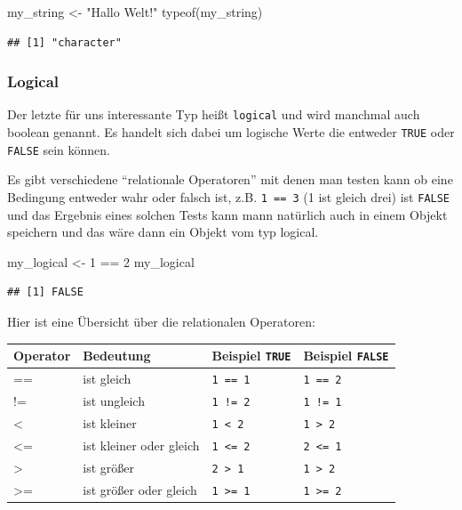 \documentclass[
]{book}
\newenvironment{Shaded}{\begin{snugshade}}{\end{snugshade}}
\newcommand{\DecValTok}[1]{\textcolor[rgb]{0.00,0.00,0.81}{#1}}
\newcommand{\FunctionTok}[1]{\textcolor[rgb]{0.00,0.00,0.00}{#1}}
\newcommand{\NormalTok}[1]{#1}
\newcommand{\OtherTok}[1]{\textcolor[rgb]{0.56,0.35,0.01}{#1}}
\newcommand{\SpecialCharTok}[1]{\textcolor[rgb]{0.00,0.00,0.00}{#1}}
\newcommand{\StringTok}[1]{\textcolor[rgb]{0.31,0.60,0.02}{#1}}
\begin{document}
\begin{Shaded}
\begin{Highlighting}[]
\NormalTok{my\_string }\OtherTok{\textless{}{-}} \StringTok{"Hallo Welt!"}
\FunctionTok{typeof}\NormalTok{(my\_string)}
\end{Highlighting}
\end{Shaded}

\begin{verbatim}
## [1] "character"
\end{verbatim}

\hypertarget{logical}{%
\subsubsection{Logical}\label{logical}}

Der letzte für uns interessante Typ heißt \texttt{logical} und wird manchmal auch boolean genannt. Es handelt sich dabei um logische Werte die entweder \texttt{TRUE} oder \texttt{FALSE} sein können.

Es gibt verschiedene ``relationale Operatoren'' mit denen man testen kann ob eine Bedingung entweder wahr oder falsch ist, z.B. \texttt{1\ ==\ 3} (1 ist gleich drei) ist \texttt{FALSE} und das Ergebnis eines solchen Tests kann mann natürlich auch in einem Objekt speichern und das wäre dann ein Objekt vom typ logical.

\begin{Shaded}
\begin{Highlighting}[]
\NormalTok{my\_logical }\OtherTok{\textless{}{-}} \DecValTok{1} \SpecialCharTok{==} \DecValTok{2}
\NormalTok{my\_logical}
\end{Highlighting}
\end{Shaded}

\begin{verbatim}
## [1] FALSE
\end{verbatim}

Hier ist eine Übersicht über die relationalen Operatoren:

\begin{longtable}[]{@{}llll@{}}
\toprule
Operator & Bedeutung & Beispiel \texttt{TRUE} & Beispiel \texttt{FALSE}\tabularnewline
\midrule
\endhead
== & ist gleich & \texttt{1\ ==\ 1} & \texttt{1\ ==\ 2}\tabularnewline
!= & ist ungleich & \texttt{1\ !=\ 2} & \texttt{1\ !=\ 1}\tabularnewline
\textless{} & ist kleiner & \texttt{1\ \textless{}\ 2} & \texttt{1\ \textgreater{}\ 2}\tabularnewline
\textless= & ist kleiner oder gleich & \texttt{1\ \textless{}=\ 2} & \texttt{2\ \textless{}=\ 1}\tabularnewline
\textgreater{} & ist größer & \texttt{2\ \textgreater{}\ 1} & \texttt{1\ \textgreater{}\ 2}\tabularnewline
\textgreater= & ist größer oder gleich & \texttt{1\ \textgreater{}=\ 1} & \texttt{1\ \textgreater{}=\ 2}\tabularnewline
\bottomrule
\end{longtable}
\end{document}

